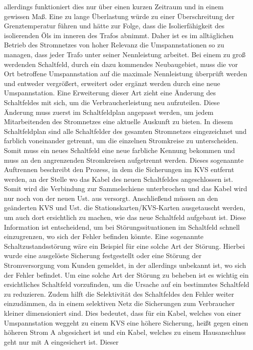 allerdings funktioniert dies nur über einen kurzen Zeitraum und in einem gewissen Maß. Eine zu lange Überlastung würde zu einer Überschreitung der 
Grenztemperatur führen und hätte zur Folge, dass die Isolierfähigkeit des isolierenden Öls im inneren des Trafos abnimmt. %
Daher ist es im alltäglichen
Betrieb des Stromnetzes von hoher Relevanz die Umspannstationen so zu managen, dass jeder Trafo unter seiner Nennleistung arbeitet. Bei einem zu groß 
werdenden Schaltfeld, durch ein \zB dazu kommendes Neubaugebiet, muss die vor Ort betroffene Umspannstation auf die maximale Nennleistung überprüft werden 
und entweder vergrößert, erweitert oder ergänzt werden durch eine neue Umspannstation. Eine Erweiterung dieser Art zieht eine Änderung des Schaltfeldes
mit sich, um die Verbraucherleistung neu aufzuteilen. Diese Änderung muss zuerst im Schaltfeldplan angepasst werden, um jedem Mitarbeitenden des 
Stromnetzes eine aktuelle Auskunft zu bieten. In diesem Schaltfeldplan sind alle Schaltfelder des gesamten Stromnetzes eingezeichnet und farblich 
voneinander getrennt, um die einzelnen Stromkreise zu unterscheiden. Somit muss ein neues Schaltfeld eine neue farbliche Kennung bekommen und muss an 
den angrenzenden Stromkreisen aufgetrennt werden. Dieses sogenannte Auftrennen beschreibt den Prozess, in dem die Sicherungen im KVS entfernt werden, 
an der Stelle wo das Kabel des neuen Schaltfeldes angeschlossen ist. Somit wird die Verbindung zur Sammelschiene unterbrochen und das Kabel wird nur 
noch von der neuen Ust. aus versorgt. Anschließend müssen an den geänderten KVS und Ust. die Stationskarten/KVS-Karten ausgetauscht werden, um auch dort
ersichtlich zu machen, wie das neue Schaltfeld aufgebaut ist. Diese Information ist entscheidend, um bei Störungssituationen im Schaltfeld schnell 
einzugrenzen, wo sich der Fehler befinden könnte. Eine sogenannte Schaltzustandsstörung wäre ein Beispiel für eine solche Art der Störung. Hierbei wurde
eine ausgelöste Sicherung festgestellt oder eine Störung der Stromversorgung vom Kunden gemeldet, in der allerdings unbekannt ist, wo sich der Fehler 
befindet. Um eine solche Art der Störung zu beheben ist es wichtig ein ersichtliches Schaltfeld vorzufinden, um die Ursache auf ein bestimmtes Schaltfeld 
zu reduzieren. Zudem hilft die Selektivität des Schaltfeldes den Fehler weiter einzudämmen, da in einem selektiven Netz die Sicherungen zum Verbraucher
kleiner dimensioniert sind. Dies bedeutet, dass für ein Kabel, welches von einer Umspannstation weggeht zu einem KVS eine höhere Sicherung, heißt 
gegen einen höheren Strom  A abgesichert ist und ein Kabel, welches zu einem Hausanschluss geht nur mit  A eingesichert ist. Dieser 

